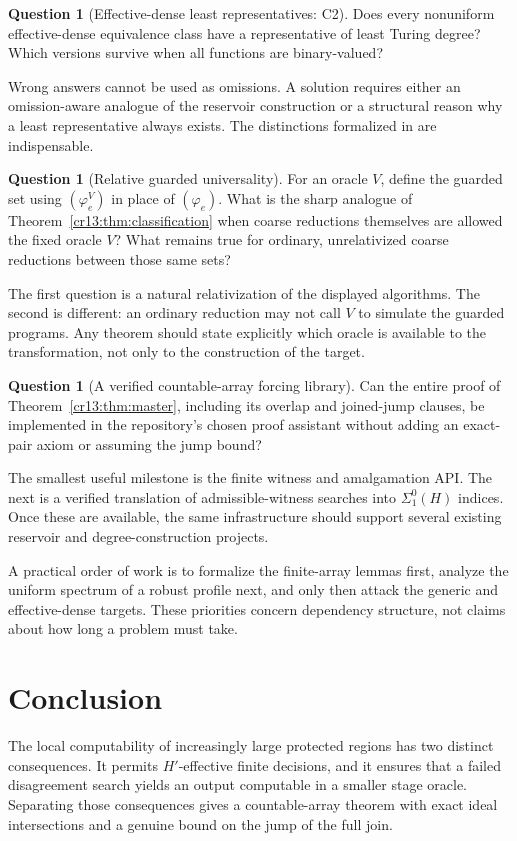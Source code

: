 \documentclass[11pt,letterpaper]{article}
\theoremstyle{definition}
\newtheorem{question}[theorem]{Question}
\theoremstyle{remark}\newtheorem{remark}[theorem]{Remark}
\numberwithin{equation}{section}
\begin{document}
\begin{question}[Effective-dense least representatives: C2]\label{cr13:q:c2}
Does every nonuniform effective-dense equivalence class have a representative of least Turing degree? Which versions survive when all functions are binary-valued?
\end{question}
Wrong answers cannot be used as omissions. A solution requires either an omission-aware analogue of the reservoir construction or a structural reason why a least representative always exists. The distinctions formalized in \cite{AHJ} are indispensable.

\begin{question}[Relative guarded universality]
For an oracle $V$, define the guarded set using $(\varphi_e^V)$ in place of $(\varphi_e)$. What is the sharp analogue of Theorem~\ref{cr13:thm:classification} when coarse reductions themselves are allowed the fixed oracle $V$? What remains true for ordinary, unrelativized coarse reductions between those same sets?
\end{question}
The first question is a natural relativization of the displayed algorithms. The second is different: an ordinary reduction may not call $V$ to simulate the guarded programs. Any theorem should state explicitly which oracle is available to the transformation, not only to the construction of the target.

\begin{question}[A verified countable-array forcing library]
Can the entire proof of Theorem~\ref{cr13:thm:master}, including its overlap and joined-jump clauses, be implemented in the repository's chosen proof assistant without adding an exact-pair axiom or assuming the jump bound?
\end{question}
The smallest useful milestone is the finite witness and amalgamation API. The next is a verified translation of admissible-witness searches into $\Sigma^0_1(H)$ indices. Once these are available, the same infrastructure should support several existing reservoir and degree-construction projects.

A practical order of work is to formalize the finite-array lemmas first, analyze the uniform spectrum of a robust profile next, and only then attack the generic and effective-dense targets. These priorities concern dependency structure, not claims about how long a problem must take.

\section{Conclusion}
The local computability of increasingly large protected regions has two distinct consequences. It permits $H'$-effective finite decisions, and it ensures that a failed disagreement search yields an output computable in a smaller stage oracle. Separating those consequences gives a countable-array theorem with exact ideal intersections and a genuine bound on the jump of the full join.
\end{document}

